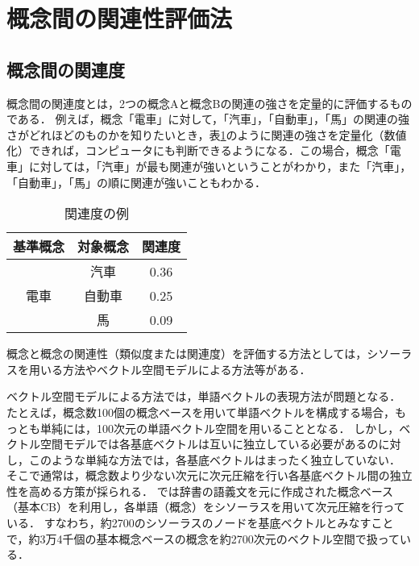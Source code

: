 \section{概念間の関連性評価法}


\subsection{概念間の関連度}

概念間の関連度とは，2つの概念Aと概念Bの関連の強さを定量的に評価するものである．
例えば，概念「電車」に対して，「汽車」，「自動車」，「馬」の関連の強さがどれほどのものかを知りたいとき，表\ref{T1}のように関連の強さを定量化（数値化）できれば，コンピュータにも判断できるようになる．この場合，概念「電車」に対しては，「汽車」が最も関連が強いということがわかり，また「汽車」，「自動車」，「馬」の順に関連が強いこともわかる．

\begin{table}[tb]
\caption[]{関連度の例}
\label{T1}
\begin{center}
\begin{tabular}{|c|c|c|} \hline
基準概念 & 対象概念 & 関連度 \\ \hline\hline
         & 汽車     & 0.36   \\ \cline{2-3}
電車     & 自動車   & 0.25   \\ \cline{2-3}
         & 馬       & 0.09   \\ \hline
\end{tabular}
\end{center}
\end{table}

概念と概念の関連性（類似度または関連度）を評価する方法としては，シソーラスを用いる方法\cite{Kurohashi,Nagao,Sumita,Fujii,Uramoto,Ooi}やベクトル空間モデルによる方法\cite{salton,Schutze,Fujii,Inako,kasahara4,Kojima}等がある．

ベクトル空間モデルによる方法では，単語ベクトルの表現方法が問題となる．
たとえば，概念数100個の概念ベースを用いて単語ベクトルを構成する場合，もっとも単純には，100次元の単語ベクトル空間を用いることとなる．
しかし，ベクトル空間モデルでは各基底ベクトルは互いに独立している必要があるのに対し，このような単純な方法では，各基底ベクトルはまったく独立していない．
そこで通常は，概念数より少ない次元に次元圧縮を行い各基底ベクトル間の独立性を高める方策が採られる．
\cite{kasahara4}では辞書の語義文を元に作成された概念ベース（基本CB）を利用し，各単語（概念）をシソーラスを用いて次元圧縮を行っている．
すなわち，約2700のシソーラスのノードを基底ベクトルとみなすことで，約3万4千個の基本概念ベースの概念を約2700次元のベクトル空間で扱っている．

